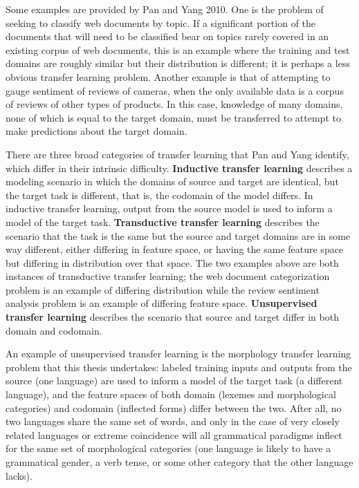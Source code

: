 Some examples are provided by Pan and Yang 2010. One is the problem of seeking to classify web documents by topic. If a significant portion of the documents that will need to be classified bear on topics rarely covered in an existing corpus of web documents, this is an example where the training and test domains are roughly similar but their distribution is different; it is perhaps a less obvious transfer learning problem. Another example is that of attempting to gauge sentiment of reviews of cameras, when the only available data is a corpus of reviews of other types of products. In this case, knowledge of many domains, none of which is equal to the target domain, must be transferred to attempt to make predictions about the target domain.

There are three broad categories of transfer learning that Pan and Yang identify, which differ in their intrinsic difficulty. \textbf{Inductive transfer learning} describes a modeling scenario in which the domains of source and target are identical, but the target task is different, that is, the codomain of the model differs. In inductive transfer learning, output from the source model is used to inform a model of the target task. \textbf{Transductive transfer learning} describes the scenario that the task is the same but the source and target domains are in some way different, either differing in feature space, or having the same feature space but differing in distribution over that space. The two examples above are both instances of transductive transfer learning; the web document categorization problem is an example of differing distribution while the review sentiment analysis problem is an example of differing feature space. \textbf{Unsupervised transfer learning} describes the scenario that source and target differ in both domain and codomain. 

An example of unsupervised transfer learning is the morphology transfer learning problem that this thesis undertakes: labeled training inputs and outputs from the source (one language) are used to inform a model of the target task (a different language), and the feature spaces of both domain (lexemes and morphological categories) and codomain (inflected forms) differ between the two. After all, no two languages share the same set of words, and only in the case of very closely related languages or extreme coincidence will all grammatical paradigms inflect for the same set of morphological categories (one language is likely to have a grammatical gender, a verb tense, or some other category that the other language lacks).

